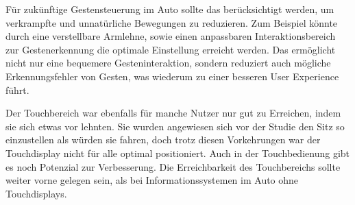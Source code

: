 Für zukünftige Gestensteuerung im Auto sollte das berücksichtigt werden, um verkrampfte und unnatürliche Bewegungen zu reduzieren. Zum Beispiel könnte durch eine verstellbare Armlehne, sowie einen anpassbaren Interaktionsbereich zur Gestenerkennung die optimale Einstellung erreicht werden. Das ermöglicht nicht nur eine bequemere Gesteninteraktion, sondern reduziert auch mögliche Erkennungsfehler von Gesten, was wiederum zu einer besseren User Experience führt.

Der Touchbereich war ebenfalls für manche Nutzer nur gut zu Erreichen, indem sie sich etwas vor lehnten. Sie  wurden angewiesen sich vor der Studie den Sitz so einzustellen als würden sie fahren, doch trotz diesen Vorkehrungen war der Touchdisplay nicht für alle optimal positioniert. Auch in der Touchbedienung gibt es noch Potenzial zur Verbesserung. Die Erreichbarkeit des Touchbereichs sollte weiter vorne gelegen sein, als bei Informationssystemen im Auto ohne Touchdisplays.